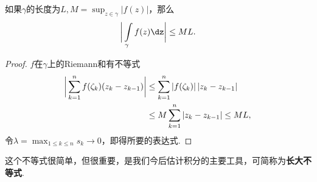 \begin{prop}\label{prop3.1.6}
如果$\gamma$的长度为$L,M=\sup_{z\in\gamma}|f(z)|$，那么
\begin{equation}\label{eq3.1.4}
\bigg|\int\limits_\gamma f(z)\dz\bigg|\le ML.
\end{equation}
\end{prop}
\begin{proof}
  $f$在$\gamma$上的Riemann和有不等式
\begin{align*}
\bigg|\sum_{k=1}^nf(\zeta_k)(z_k-z_{k-1})\bigg|&
\le\sum_{k=1}^n|f(\zeta_k)|\,|z_k-z_{k-1}|\\
&\le M\sum_{k=1}^n|z_k-z_{k-1}|\le ML, \qedhere
\end{align*}
令$\lambda=\max_{1\le k\le n}s_k\to0$，即得所要的表达式.
\end{proof}

这个不等式很简单，但很重要，是我们今后估计积分的主要工具，可简称为\textbf{长大不等式}.

